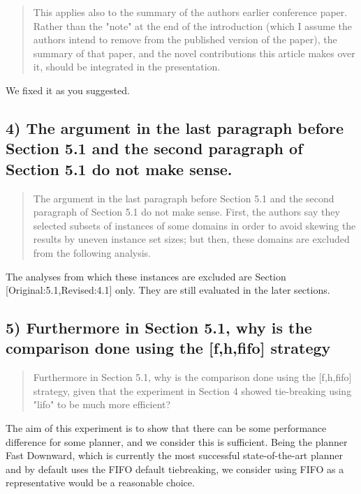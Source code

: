 \documentclass{article}
\begin{document}
\begin{quote}
 This applies also to the summary of the authors earlier conference
paper. Rather than the "note" at the end of the introduction (which I
assume the authors intend to remove from the published version of the
paper), the summary of that paper, and the novel contributions this
article makes over it, should be integrated in the presentation.
\end{quote}

We fixed it as you suggested.

\subsection{4) The argument in the last paragraph before Section 5.1 and the second paragraph of Section 5.1 do not make sense.}
\label{sec:orgheadline29}

\begin{quote}
 The argument in the last paragraph before Section 5.1 and the second
paragraph of Section 5.1 do not make sense. First, the authors say
they selected subsets of instances of some domains in order to avoid
skewing the results by uneven instance set sizes; but then, these
domains are excluded from the following analysis.
\end{quote}

The analyses from which these instances are excluded are Section [Original:5.1,Revised:4.1] only.
They are still evaluated in the later sections.

\subsection{5) Furthermore in Section 5.1, why is the comparison done using the [f,h,fifo] strategy}
\label{sec:orgheadline30}

\begin{quote}
 Furthermore in Section 5.1, why is the comparison done using the
[f,h,fifo] strategy, given that the experiment in Section 4 showed
tie-breaking using "lifo" to be much more efficient?
\end{quote}

The aim of this experiment is to show that there can be some performance difference for some planner,
and we consider this is sufficient.
Being the planner Fast Downward, which is currently the most successful state-of-the-art planner
and by default uses the FIFO default tiebreaking,
we consider using FIFO as a representative would be a reasonable choice.
\end{document}
